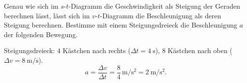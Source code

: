 \documentclass[addpoints,11pt,a4paper]{exam}
\newlength{\antwortraumlen}
\newcommand{\Antwortraum}[1]{%
  \pgfmathsetlength{\antwortraumlen}{#1*2.5cm}%
  \begin{answerbox}
    \rule{0pt}{\antwortraumlen}%
  \end{answerbox}%
}
\begin{document}
\begin{questions}
\setcounter{question}{2}
\begin{taskbox}
\question[3] Genau wie sich im $s$-$t$-Diagramm die Geschwindigkeit als
Steigung der Geraden berechnen lässt, lässt sich im $v$-$t$-Diagramm die
Beschleunigung als deren Steigung berechnen. Bestimme mit einem
Steigungsdreieck die Beschleunigung $a$ der folgenden Bewegung.

\begin{center}
\end{center}

\Antwortraum{3}
\begin{solution}
Steigungsdreieck: $4$ Kästchen nach rechts ($\Delta t=\SI{4}{\second}$),
$8$ Kästchen nach oben ($\Delta v=\SI{8}{\meter\per\second}$).
\[
  a = \frac{\Delta v}{\Delta t} = \frac{8}{4}\,\si{\meter\per\second\squared} = \SI{2}{\meter\per\second\squared}.
\]
\end{solution}
\end{taskbox}
\end{questions}

\end{document}
